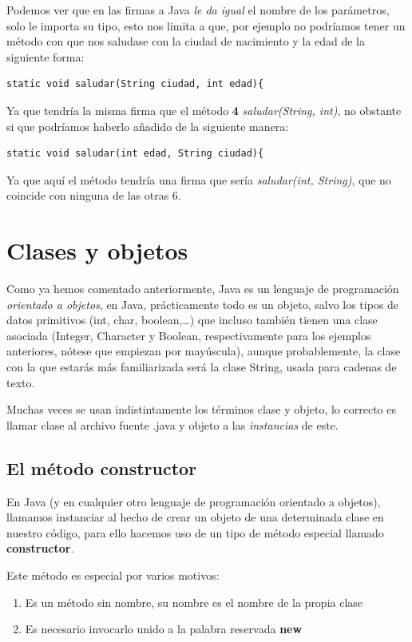 \documentclass[11pt]{article}
\begin{document}
Podemos ver que en las firmas a Java \emph{le da igual} el nombre de los parámetros, solo le importa su tipo, esto nos limita a que, por ejemplo no podríamos tener un método con que nos saludase con la ciudad de nacimiento y la edad de la siguiente forma:

\begin{verbatim}
static void saludar(String ciudad, int edad){
\end{verbatim}

Ya que tendría la misma firma que el método \textbf{4} \emph{saludar(String, int)}, no obstante si que podríamos haberlo añadido de la siguiente manera:

\begin{verbatim}
static void saludar(int edad, String ciudad){
\end{verbatim}

Ya que aquí el método tendría una firma que sería \emph{saludar(int, String)}, que no coincide con ninguna de las otras 6.

\section{Clases y objetos}
\label{sec:org6b358af}
Como ya hemos comentado anteriormente, Java es un lenguaje de programación \emph{orientado a objetos}, en Java, prácticamente todo es un objeto, salvo los tipos de datos primitivos (int, char, boolean,\ldots{}) que incluso también tienen una clase asociada (Integer, Character y Boolean, respectivamente para los ejemplos anteriores, nótese que empiezan por mayúscula), aunque probablemente, la clase con la que estarás más familiarizada será la clase String, usada para cadenas de texto.

Muchas veces se usan indistintamente los términos clase y objeto, lo correcto es llamar clase al archivo fuente .java y objeto a las \emph{instancias} de este.

\subsection{El método constructor}
\label{sec:org5771470}
En Java (y en cualquier otro lenguaje de programación orientado a objetos), llamamos instanciar al hecho de crear un objeto de una determinada clase en nuestro código, para ello hacemos uso de un tipo de método especial llamado \textbf{constructor}.

Este método es especial por varios motivos:

\begin{enumerate}
\item Es un método sin nombre, su nombre es el nombre de la propia clase
\item Es necesario invocarlo unido a la palabra reservada \textbf{new}
\end{enumerate}
\end{document}
